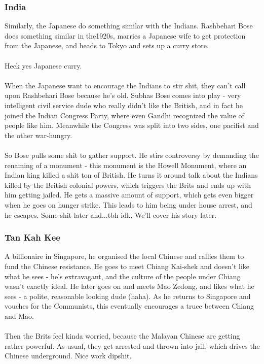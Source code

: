 \documentclass[a4paper]{article}
\begin{document}
\subsubsection{India}
Similarly, the Japanese do something similar with the Indians. Rashbehari Bose does something similar in the1920s, marries a Japanese wife to get protection from the Japanese, and heads to Tokyo and sets up a curry store. \\
\\
Heck yes Japanese curry.\\ 
\\
When the Japanese want to encourage the Indians to stir shit, they can't call upon Rashbehari Bose because he's old. Subhas Bose comes into play - very intelligent civil service dude who really didn't like the British, and in fact he joined the Indian Congress Party, where even Gandhi recognized the value of people like him. Meanwhile the Congress was split into two sides, one pacifist and the other war-hungry.\\
\\
So Bose pulls some shit to gather support. He stirs controversy by demanding the renaming of a monument - this monument is the Howell Monument, where an Indian king killed a shit ton of British. He turns it around talk about the Indians killed by the British colonial powers, which triggers the Brits and ends up with him getting jailed. He gets a massive amount of support, which gets even bigger when he goes on hunger strike. This leads to him being under house arrest, and he escapes. Some shit later and...tbh idk. We'll cover his story later.
\subsubsection{Tan Kah Kee}
A billionaire in Singapore, he organised the local Chinese and rallies them to fund the Chinese resistance. He goes to meet Chiang Kai-shek and doesn't like what he sees - he's extravagant, and the culture of the people under Chiang wasn't exactly ideal. He later goes on and meets Mao Zedong, and likes what he sees - a polite, reasonable looking dude (haha). As he returns to Singapore and vouches for the Communists, this eventually encourages a truce between Chiang and Mao.\\
\\
Then the Brits feel kinda worried, because the Malayan Chinese are getting rather powerful. As usual, they get arrested and thrown into jail, which drives the Chinese underground. Nice work dipshit.
\end{document}
